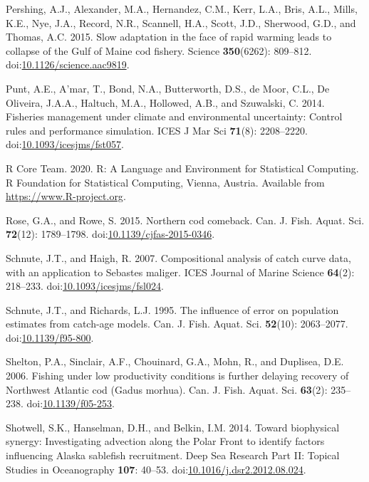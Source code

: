 \documentclass[]{article}
\begin{document}
\leavevmode\hypertarget{ref-pershing2015Slow}{}%
Pershing, A.J., Alexander, M.A., Hernandez, C.M., Kerr, L.A., Bris,
A.L., Mills, K.E., Nye, J.A., Record, N.R., Scannell, H.A., Scott, J.D.,
Sherwood, G.D., and Thomas, A.C. 2015. Slow adaptation in the face of
rapid warming leads to collapse of the Gulf of Maine cod fishery.
Science \textbf{350}(6262): 809--812.
doi:\href{https://doi.org/10.1126/science.aac9819}{10.1126/science.aac9819}.

\leavevmode\hypertarget{ref-punt2014Fisheries}{}%
Punt, A.E., A'mar, T., Bond, N.A., Butterworth, D.S., de Moor, C.L., De
Oliveira, J.A.A., Haltuch, M.A., Hollowed, A.B., and Szuwalski, C. 2014.
Fisheries management under climate and environmental uncertainty:
Control rules and performance simulation. ICES J Mar Sci \textbf{71}(8):
2208--2220.
doi:\href{https://doi.org/10.1093/icesjms/fst057}{10.1093/icesjms/fst057}.

\leavevmode\hypertarget{ref-rcoreteam2020Language}{}%
R Core Team. 2020. R: A Language and Environment for Statistical
Computing. R Foundation for Statistical Computing, Vienna, Austria.
Available from \url{https://www.R-project.org}.

\leavevmode\hypertarget{ref-rose2015Northern}{}%
Rose, G.A., and Rowe, S. 2015. Northern cod comeback. Can. J. Fish.
Aquat. Sci. \textbf{72}(12): 1789--1798.
doi:\href{https://doi.org/10.1139/cjfas-2015-0346}{10.1139/cjfas-2015-0346}.

\leavevmode\hypertarget{ref-schnute2007Compositional}{}%
Schnute, J.T., and Haigh, R. 2007. Compositional analysis of catch curve
data, with an application to Sebastes maliger. ICES Journal of Marine
Science \textbf{64}(2): 218--233.
doi:\href{https://doi.org/10.1093/icesjms/fsl024}{10.1093/icesjms/fsl024}.

\leavevmode\hypertarget{ref-schnute1995Influence}{}%
Schnute, J.T., and Richards, L.J. 1995. The influence of error on
population estimates from catch-age models. Can. J. Fish. Aquat. Sci.
\textbf{52}(10): 2063--2077.
doi:\href{https://doi.org/10.1139/f95-800}{10.1139/f95-800}.

\leavevmode\hypertarget{ref-shelton2006Fishing}{}%
Shelton, P.A., Sinclair, A.F., Chouinard, G.A., Mohn, R., and Duplisea,
D.E. 2006. Fishing under low productivity conditions is further delaying
recovery of Northwest Atlantic cod (Gadus morhua). Can. J. Fish. Aquat.
Sci. \textbf{63}(2): 235--238.
doi:\href{https://doi.org/10.1139/f05-253}{10.1139/f05-253}.

\leavevmode\hypertarget{ref-shotwell2014Biophysical}{}%
Shotwell, S.K., Hanselman, D.H., and Belkin, I.M. 2014. Toward
biophysical synergy: Investigating advection along the Polar Front to
identify factors influencing Alaska sablefish recruitment. Deep Sea
Research Part II: Topical Studies in Oceanography \textbf{107}: 40--53.
doi:\href{https://doi.org/10.1016/j.dsr2.2012.08.024}{10.1016/j.dsr2.2012.08.024}.
\end{document}

